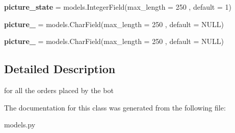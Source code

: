 \begin{DoxyCompactItemize}
{\bfseries picture\+\_\+state} = models.\+Integer\+Field(max\+\_\+length = 250 , default = 1)
\item 
\mbox{\label{classmessengerbot_1_1models_1_1order_acc10f001e574003ae4617a3cd00d2e9f}} 
{\bfseries picture\+\_} = models.\+Char\+Field(max\+\_\+length = 250 , default = \textquotesingle{}N\+U\+LL\textquotesingle{})
\item 
\mbox{\label{classmessengerbot_1_1models_1_1order_a385906e5e952802d4faa7eb82edbd0dd}} 
{\bfseries picture\+\_} = models.\+Char\+Field(max\+\_\+length = 250 , default = \textquotesingle{}N\+U\+LL\textquotesingle{})
\end{DoxyCompactItemize}


\subsection{Detailed Description}
\begin{DoxyVerb}for all the orders placed by the bot\end{DoxyVerb}
 

The documentation for this class was generated from the following file\+:\begin{DoxyCompactItemize}
\item 
models.\+py\end{DoxyCompactItemize}
